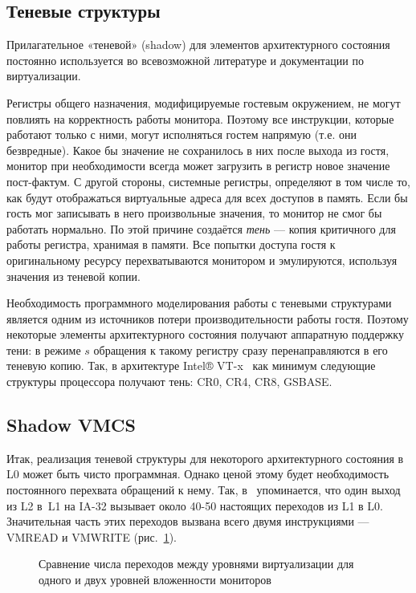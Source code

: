 \subsection{Теневые структуры}

Прилагательное «теневой» (\abbr shadow) для элементов архитектурного состояния постоянно используется во всевозможной литературе и документации по виртуализации.

Регистры общего назначения, модифицируемые гостевым окружением, не могут повлиять на корректность работы монитора. Поэтому все инструкции, которые работают только с ними, могут исполняться гостем напрямую (т.е. они безвредные). Какое бы значение не сохранилось в них после выхода из гостя, монитор при необходимости всегда может загрузить в регистр новое значение пост-фактум. С другой стороны, системные регистры, определяют в том числе то, как будут отображаться виртуальные адреса для всех доступов в память. Если бы гость мог записывать в него произвольные значения, то монитор не смог бы работать нормально. По этой причине создаётся \textit{тень} — копия критичного для работы регистра, хранимая в памяти. Все попытки доступа гостя к оригинальному ресурсу перехватываются монитором и эмулируются, используя значения из теневой копии.

Необходимость программного моделирования работы с теневыми структурами является одним из источников потери производительности работы гостя. Поэтому некоторые элементы архитектурного состояния получают аппаратную поддержку тени: в режиме $s$ обращения к такому регистру сразу перенаправляются в его теневую копию.
Так, в архитектуре Intel® VT-x \cite{vtx} как минимум следующие структуры процессора получают тень: CR0, CR4, CR8, GSBASE.

\subsection{Shadow VMCS}
Итак, реализация теневой структуры для некоторого архитектурного состояния в L0 может быть чисто программная. Однако ценой этому будет необходимость постоянного перехвата обращений к нему. Так, в \cite{nested-virt-kvm-2013} упоминается, что один выход из L2 в L1 на IA-32 вызывает около 40-50 настоящих переходов из L1 в L0. Значительная часть этих переходов вызвана всего двумя инструкциями — VMREAD и VMWRITE (рис. \ref{fig:nested-vmread}).

\begin{figure}[htb]
    \centering
    \caption[Сравнение числа переходов между уровнями виртуализации]{Сравнение числа переходов между уровнями виртуализации для одного и двух уровней вложенности мониторов}
    \label{fig:nested-vmread}
\end{figure}

